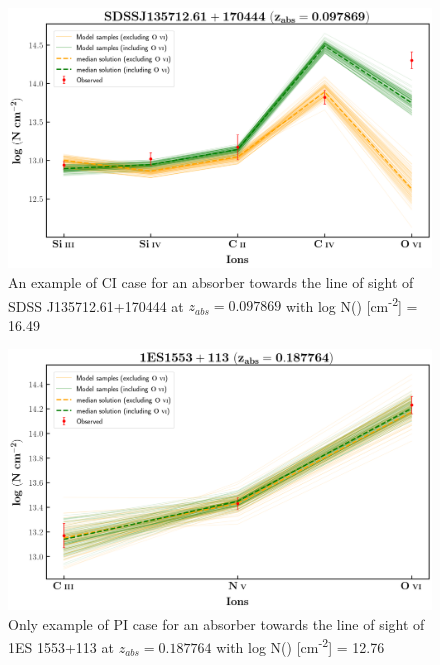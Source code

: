 \begin{figure}
    \centering
    \includegraphics[width=\linewidth]{Figures/s135712-z=0.097869-compII.png}
    \caption{An example of CI case for an absorber towards the line of sight of SDSS J135712.61+170444 at $z_{abs}=0.097869$ with log N() [cm\textsuperscript{-2}] = 16.49}
    \label{fig:ex-CI}
\end{figure}

\begin{figure}
    \centering
    \includegraphics[width=\linewidth]{Figures/1es1553-z=0.187764-compI.png}
    \caption{Only example of PI case for an absorber towards the line of sight of 1ES 1553+113 at $z_{abs}=0.187764$ with log N() [cm\textsuperscript{-2}] = 12.76}
    \label{fig:ex-PI}
\end{figure}


